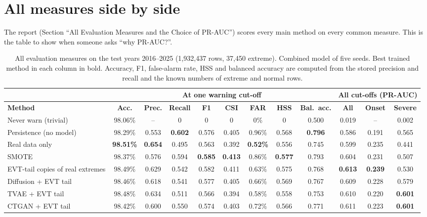 \section{All measures side by side}
The report (Section ``All Evaluation Measures and the Choice of PR-AUC'') scores every main method on every common
measure. This is the table to show when someone asks ``why PR-AUC?''.
\begin{table}[H]
\centering
\caption{All evaluation measures on the test years 2016--2025 (1{,}932{,}437 rows, 37{,}450 extreme). Combined model of
five seeds. Best trained method in each column in bold. Accuracy, F1, false-alarm rate, HSS and balanced accuracy are
computed from the stored precision and recall and the known numbers of extreme and normal rows.}

\tiny
\setlength{\tabcolsep}{3.2pt}
\begin{tabular}{|l|c|c|c|c|c|c|c|c||c|c|c|}
\hline
 & \multicolumn{8}{c||}{\textbf{At one warning cut-off}} & \multicolumn{3}{c|}{\textbf{All cut-offs (PR-AUC)}}\\ \hline
\textbf{Method} & \textbf{Acc.} & \textbf{Prec.} & \textbf{Recall} & \textbf{F1} & \textbf{CSI} & \textbf{FAR} & \textbf{HSS} & \textbf{Bal.\ acc.} & \textbf{All} & \textbf{Onset} & \textbf{Severe}\\ \hline
Never warn (trivial) & 98.06\% & -- & 0 & 0 & 0 & 0\% & 0 & 0.500 & 0.019 & -- & 0.002\\ \hline
Persistence (no model) & 98.29\% & 0.553 & \textbf{0.602} & 0.576 & 0.405 & 0.96\% & 0.568 & \textbf{0.796} & 0.586 & 0.191 & 0.565\\ \hline
Real data only & \textbf{98.51\%} & \textbf{0.654} & 0.495 & 0.563 & 0.392 & \textbf{0.52\%} & 0.556 & 0.745 & 0.599 & 0.235 & 0.441\\ \hline
SMOTE & 98.37\% & 0.576 & 0.594 & \textbf{0.585} & \textbf{0.413} & 0.86\% & \textbf{0.577} & 0.793 & 0.604 & 0.231 & 0.507\\ \hline
EVT-tail copies of real extremes & 98.49\% & 0.629 & 0.542 & 0.582 & 0.411 & 0.63\% & 0.575 & 0.768 & \textbf{0.613} & \textbf{0.239} & 0.530\\ \hline
Diffusion + EVT tail & 98.46\% & 0.618 & 0.541 & 0.577 & 0.405 & 0.66\% & 0.569 & 0.767 & 0.609 & 0.228 & 0.579\\ \hline
TVAE + EVT tail & 98.48\% & 0.634 & 0.511 & 0.566 & 0.394 & 0.58\% & 0.558 & 0.753 & 0.610 & 0.220 & \textbf{0.601}\\ \hline
CTGAN + EVT tail & 98.42\% & 0.600 & 0.550 & 0.574 & 0.403 & 0.72\% & 0.566 & 0.771 & 0.611 & 0.223 & \textbf{0.601}\\ \hline
\end{tabular}
\end{table}


